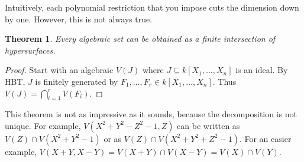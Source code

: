\documentclass[12pt]{article}
\newtheorem{theorem}{Theorem}[section]
\theoremstyle{definition}
\begin{document}
Intuitively, each polynomial restriction that you impose cuts the dimension down by one. However, this is not always true.
\begin{theorem}
    Every algebraic set can be obtained as a finite intersection of hypersurfaces.
\end{theorem}
\begin{proof}
    Start with an algebraic  $V(J)$ where $J\subseteq k[X_1,\dotsc,X_n]$ is an ideal. By HBT, $J$ is finitely generated by $F_1,\dotsc,F_r\in k[X_1,\dotsc,X_n]$. Thus $V(J)=\bigcap\limits_{i=1}^rV(F_i)$.
\end{proof}
This theorem is not as impressive as it sounds, because the decomposition is not unique. For example, $V(X^2+Y^2-Z^2-1,Z)$ can be written as $V(Z)\cap V(X^2+Y^2-1)$ or as $V(Z)\cap V(X^2+Y^2+Z^2-1)$. For an easier example, $V(X+Y,X-Y)=V(X+Y)\cap V(X-Y)=V(X)\cap V(Y)$.
\end{document}
